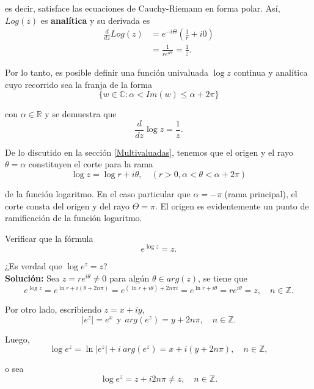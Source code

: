 es decir, satisface las ecuaciones de Cauchy-Riemann en forma polar. Así, $Log(z)$ es \textbf{analítica} y su derivada es
\begin{align*}
\frac{d}{dz} Log(z) &= e^{-i\Theta} \left( \frac{1}{r} + i0 \right) \\
&= \frac{1}{r e^{i \Theta}} = \frac{1}{z}.
\end{align*}

Por lo tanto, es posible definir una función univaluada $\log z$ continua y analítica cuyo recorrido sea la franja de la forma
$$\{w\in \mathbb{C} : \alpha < Im(w) \leq \alpha + 2\pi\}$$

con $\alpha \in \mathbb{R}$ y se demuestra que 
$$\frac{d}{dz} \log z = \frac{1}{z}.$$

De lo discutido en la sección \ref{Multivaluadas}, tenemos que el origen y el rayo $\theta = \alpha$ constituyen el corte para la rama
$$\log z = \log r + i\theta, \quad (r > 0, \alpha < \theta < \alpha +2\pi)$$

de la función logaritmo. En el caso particular que $\alpha = - \pi$ (rama principal), el corte consta del origen y del rayo $\Theta = \pi$. El origen es evidentemente un punto de ramificación de la función logaritmo.

\begin{ejemplo}
Verificar que la fórmula
$$e^{\log z} = z.$$

¿Es verdad que  $\log e^z = z$?
\\

\textbf{Solución:} Sea $z = r e^{i\theta} \neq 0$ para algún $\theta \in arg(z)$, se tiene que 
$$e^{\log z} = e^{\ln r + i(\theta + 2n\pi)} = e^{(\ln r + i\theta) + 2n\pi i} = e^{\ln r + i\theta} = r e^{i\theta} = z, \quad n \in \mathbb{Z}.$$

Por otro lado, escribiendo $z = x + iy$,
$$|e^z| = e^x ~~\mbox{y}~~ arg(e^z) = y + 2n\pi, \quad n \in \mathbb{Z}.$$

Luego, 
$$\log e^z = \ln |e^z| + i ~arg(e^z) = x + i(y+2n\pi), \quad n \in \mathbb{Z},$$

o sea 
$$\log e^z = z + i 2n\pi \neq z, \quad n \in \mathbb{Z}.$$

\end{ejemplo}

